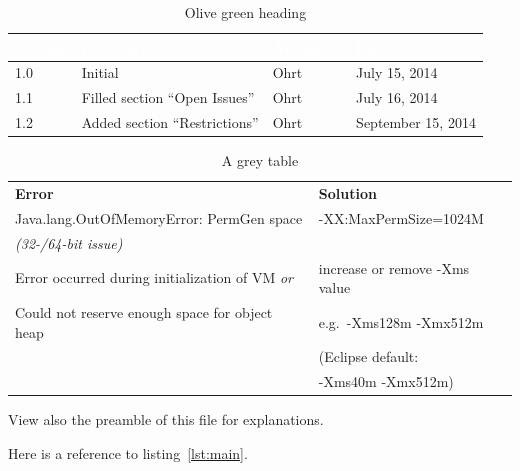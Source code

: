\begin{center}
\begin{table}[h]
\begin{tabular}{|l|l|l|l|}\hline
\rowcolor{olivegreen30}
\textcolor{white}{\textbf{Version}}
		&
		\textcolor{white}{\textbf{Description}}	&
							\textcolor{white}{\textbf{Author(s)}}	&
																\textcolor{white}{\textbf{Date}}\\\hline
1.0		& Initial				& Ohrt					& July 15, 2014\\\hline
1.1		& Filled section ``Open Issues''	& Ohrt					& July 16, 2014\\\hline
1.2		& Added section ``Restrictions''	& Ohrt					& September 15, 2014\\\hline
\end{tabular}
\caption{Olive green heading} \label{tab:olive}
\end{table}

\begin{table}[h]
\begin{tabular}{ l | l }
\rowcolor{gray20}\textbf{Error}	& \textbf{Solution} \\
\rowcolor{gray5}Java.lang.OutOfMemoryError: PermGen space
									& -XX:MaxPermSize=1024M \\
\rowcolor{gray5}\textit{(32-/64-bit issue)}
									& \\
\rowcolor{gray20}Error occurred during initialization of VM \textit{or}
									& increase or remove -Xms value \\
\rowcolor{gray20}Could not reserve enough space for object heap
									& e.g.\ -Xms128m -Xmx512m \\
\rowcolor{gray20}					& \small{(Eclipse default:}\\
\rowcolor{gray20}					& \small{-Xms40m -Xmx512m)} \\
\end{tabular}
\caption{A grey table} \label{tab:grey}
\end{table}
\end{center}

View also the preamble of this file for explanations.

Here is a reference to listing~\ref{lst:main}.

\chapterend
